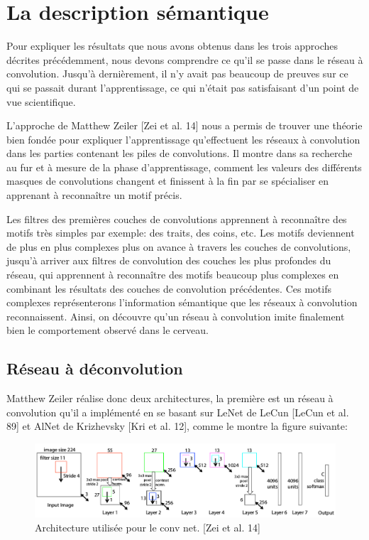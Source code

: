 \section{La description sémantique}

	Pour expliquer les résultats que nous avons obtenus dans les trois approches décrites précédemment, nous devons comprendre ce qu'il se passe dans le réseau à convolution. Jusqu’à dernièrement, il n'y avait pas beaucoup de preuves sur ce qui se passait durant l'apprentissage, ce qui n’était pas satisfaisant d'un point de vue scientifique.

	L'approche de Matthew Zeiler [Zei et al. 14] nous a permis de trouver une théorie bien fondée pour expliquer l'apprentissage qu'effectuent les réseaux à convolution dans les parties contenant les piles de convolutions. Il montre dans sa recherche au fur et à mesure de la phase d'apprentissage, comment les valeurs des différents masques de convolutions changent et finissent à la fin par se spécialiser en apprenant à reconnaître un motif précis.
	
	Les filtres des premières couches de convolutions apprennent à reconnaître des motifs très simples par exemple: des traits, des coins, etc.	Les motifs deviennent de plus en plus complexes plus on avance à travers les couches de convolutions, jusqu'à arriver aux filtres de convolution des couches les plus profondes du réseau, qui apprennent à reconnaître des motifs beaucoup plus complexes en combinant les résultats des couches de convolution précédentes. Ces motifs complexes représenterons l'information sémantique que les réseaux à convolution reconnaissent.
Ainsi, on découvre qu'un réseau à convolution imite finalement bien le comportement observé dans le cerveau.

\subsection{Réseau à déconvolution}

	Matthew Zeiler réalise donc deux architectures, la première est un réseau à convolution qu'il a implémenté en se basant sur LeNet de LeCun [LeCun et al. 89] et AlNet de Krizhevsky [Kri et al. 12], comme le montre la figure suivante:

\begin{figure}[H]
	\centering
		\includegraphics[width=5in]{Figures/arch.png}
	\caption[Res]{Architecture utilisée pour le conv net. [Zei et al. 14]}
	\label{fig:Electron}
\end{figure}

